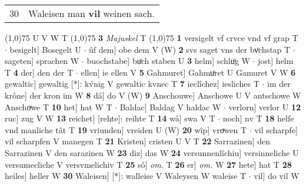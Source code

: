 \documentclass[8pt,a4paper,notitlepage]{article}
\begin{document}
\begin{table}[ht]
\begin{minipage}[t]{0.5\linewidth}
\begin{tabular}{rl}
30 & Waleisen man \textbf{vil} weinen sach.\\ 
\end{tabular}
\scriptsize
\line(1,0){75} \newline
U V W T \newline
\line(1,0){75} \newline
\textbf{3} \textit{Majuskel} T  \newline
\line(1,0){75} \newline
\textbf{1} versigelt vf crvce vnd vf grap T  $\cdot$ besigelt] Bosegelt U  $\cdot$ ûf dem] obe dem V (W) \textbf{2} svs saget vns der bvͦchstap T  $\cdot$ sageten] sprachen W  $\cdot$ buochstabe] buͦch staben U \textbf{3} helm] schluͦg W  $\cdot$ jost] helm T \textbf{4} der] den der T  $\cdot$ ellen] ie ellen V \textbf{5} Gahmuret] Gahmuͦret U Gamuret V W \textbf{6} gewaltic] gewaltig [*]: kv́nig V gewaltic kvnec T \textbf{7} ieclîchez] iesliches T  $\cdot$ im der krône] der kron im W \textbf{8} dâ] do V (W) \textbf{9} Anschouwe] Anschowe U V antschowe W Anschoͮwe T \textbf{10} het] hat W T  $\cdot$ Baldac] Baldag V haldac W  $\cdot$ verlorn] verlor U \textbf{12} ruc] zug V W \textbf{13} reichet] [rehte]: reihte T \textbf{14} wâ] swa V T  $\cdot$ noch] nv T \textbf{18} helfe vnd manliche tât T \textbf{19} vriunden] vreiden U (W) \textbf{20} wîp] vroͮwen T  $\cdot$ vil scharpfe] vil scharpfen V manegen T \textbf{21} Kristen] cristen U V T \textbf{22} Sarrazinen] den Sarrazinen V den sarazinen W \textbf{23} diz] das W \textbf{24} versunnenlîchiu] versinneliche U versumecliche V versvmelichiv T \textbf{25} sô] \textit{om.} T \textbf{26} er] \textit{om.} W \textbf{27} hete] hat T \textbf{28} heiles] heller W \textbf{30} Waleisen] [*]: walleise V Waleysen W waleise T  $\cdot$ vil] do vil W \newline
\end{minipage}
\end{table}
\end{document}
